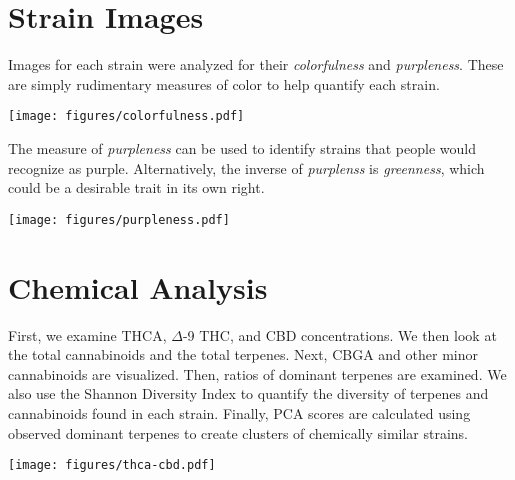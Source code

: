 \documentclass[../article.tex, 12pt]{subfiles}
\begin{document}
\begin{multicols}{2}
\newpage
\section*{Strain Images}
\label{sec:Strain Images}

Images for each strain were analyzed for their {\itshape colorfulness} and {\itshape purpleness}. These are simply rudimentary measures of color to help quantify each strain.

\vspace{1\baselineskip}

\texttt{[image: figures/colorfulness.pdf]}

\vspace{1\baselineskip}

The measure of {\itshape purpleness} can be used to identify strains that people would recognize as purple. Alternatively, the inverse of {\itshape purplenss} is {\itshape greenness}, which could be a desirable trait in its own right.

\vspace{1\baselineskip}

\texttt{[image: figures/purpleness.pdf]}

{\scriptsize
\vspace{1\baselineskip}

}


\newpage
\section*{Chemical Analysis}
\label{sec:Chemical Analysis}
\thispagestyle{regular}

First, we examine THCA, $\Delta$-9 THC, and CBD concentrations. We then look at the total cannabinoids and the total terpenes. Next, CBGA and other minor cannabinoids are visualized. Then, ratios of dominant terpenes are examined. We also use the Shannon Diversity Index to quantify the diversity of terpenes and cannabinoids found in each strain. Finally, PCA scores are calculated using observed dominant terpenes to create clusters of chemically similar strains.

\vspace{1\baselineskip}

\texttt{[image: figures/thca-cbd.pdf]}


\end{multicols}
\end{document}
